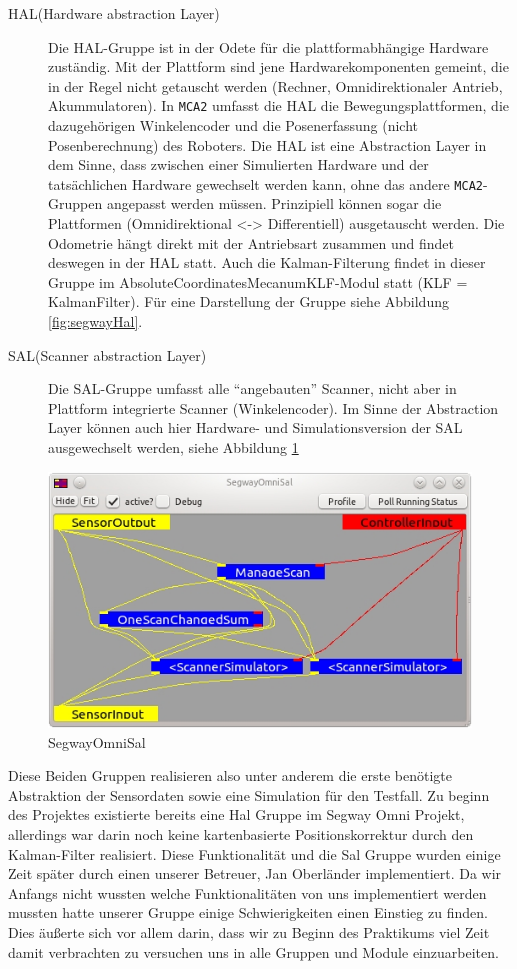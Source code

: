 \begin{description}
\item[HAL(Hardware abstraction Layer)] Die HAL-Gruppe ist in der Odete für die
plattformabhängige Hardware zuständig.
 Mit der Plattform sind jene Hardwarekomponenten gemeint, die in der Regel nicht getauscht werden 
 (Rechner, Omnidirektionaler Antrieb, Akummulatoren).
 In \lstinline{MCA2} umfasst die HAL die Bewegungsplattformen, die dazugehörigen
 Winkelencoder und die Posenerfassung (nicht Posenberechnung) des Roboters. Die HAL ist eine Abstraction Layer in dem Sinne, dass zwischen einer Simulierten
 Hardware und der tatsächlichen Hardware gewechselt werden kann, ohne das andere
 \lstinline{MCA2}-Gruppen angepasst werden müssen.
 Prinzipiell können sogar die Plattformen (Omnidirektional <-> Differentiell) ausgetauscht werden. Die Odometrie hängt
 direkt mit der Antriebsart zusammen und findet deswegen in der HAL statt.
 Auch die Kalman-Filterung findet in dieser Gruppe im
 AbsoluteCoordinatesMecanumKLF-Modul statt (KLF = KalmanFilter). Für eine
 Darstellung der Gruppe siehe Abbildung \ref{fig:segwayHal}.
\item[SAL(Scanner abstraction Layer)] Die SAL-Gruppe umfasst alle ``angebauten''
Scanner, nicht aber in Plattform integrierte Scanner (Winkelencoder).
 Im Sinne der Abstraction Layer können auch hier Hardware- und
 Simulationsversion der SAL ausgewechselt werden, siehe Abbildung
 \ref{fig:SegwayOmniSal}
\end{description}
\begin{figure}[h]
\center
\includegraphics[scale=0.7]{graphics/SegwayOmniSal.jpg}
\caption{\label{fig:SegwayOmniSal} SegwayOmniSal}
\end{figure}

Diese Beiden Gruppen realisieren also unter anderem die erste benötigte
 Abstraktion der Sensordaten sowie eine Simulation für den Testfall. Zu beginn
 des Projektes existierte bereits eine Hal Gruppe im Segway Omni Projekt,
 allerdings war darin noch keine kartenbasierte
 Positionskorrektur durch den Kalman-Filter realisiert. Diese Funktionalität und die Sal Gruppe wurden
 einige Zeit später durch einen unserer Betreuer, Jan Oberländer implementiert. Da wir Anfangs nicht wussten
 welche Funktionalitäten von uns implementiert werden mussten hatte unserer Gruppe einige Schwierigkeiten
 einen Einstieg zu finden. Dies äußerte sich vor allem darin, dass wir zu Beginn des Praktikums viel Zeit damit
 verbrachten zu versuchen uns in alle Gruppen und Module einzuarbeiten.


